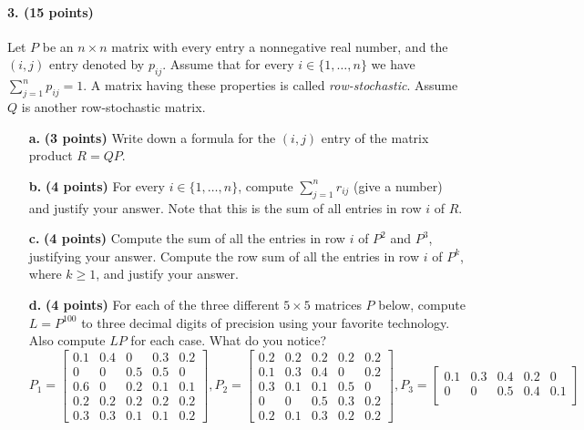 \documentclass[11pt]{article}
\begin{document}
\paragraph{3. (15 points)} Let $P$ be an $n \times n$ matrix with every entry a nonnegative real number, and the $(i,j)$ entry denoted by $p_{ij}$. Assume that for every $i \in \{1,\ldots,n\}$ we have $\sum_{j=1}^n p_{ij}=1$. A matrix having these properties is called \emph{row-stochastic}. Assume $Q$ is another row-stochastic matrix.
\begin{itemize}
  \item[\textbf{a.}] \textbf{(3 points)} Write down a formula for the $(i,j)$ entry of the matrix product $R=QP$.
  \item[\textbf{b.}] \textbf{(4 points)} For every $i \in \{1,\ldots,n\}$, compute  $\sum_{j=1}^n r_{ij}$ (give a number) and justify your answer. Note that this is the sum of all entries in row $i$ of $R$.
  \item[\textbf{c.}] \textbf{(4 points)} Compute the sum of all the entries in row $i$ of $P^2$ and $P^3$, justifying your answer. Compute the row sum of all the entries in row $i$ of $P^k$, where $k \geq 1$, and justify your answer.
  \item[\textbf{d.}] \textbf{(4 points)} For each of the three different $5 \times 5$ matrices $P$ below, compute $L=P^{100}$ to three decimal digits of precision using your favorite technology. Also compute $LP$ for each case. What do you notice?
    $$
    P_1 = \begin{bmatrix}
      0.1 & 0.4 & 0 & 0.3 & 0.2 \\
      0 & 0 & 0.5 & 0.5 & 0 \\
      0.6 & 0 & 0.2 & 0.1 & 0.1 \\
      0.2 & 0.2 & 0.2 & 0.2 & 0.2 \\
      0.3 & 0.3 & 0.1 & 0.1 & 0.2
    \end{bmatrix},
    P_2 = \begin{bmatrix}
      0.2 & 0.2 & 0.2 & 0.2 & 0.2 \\
      0.1 & 0.3 & 0.4 & 0 & 0.2 \\
      0.3 & 0.1 & 0.1 & 0.5 & 0 \\
      0 & 0 & 0.5 & 0.3 & 0.2 \\
      0.2 & 0.1 & 0.3 & 0.2 & 0.2
    \end{bmatrix},
    P_3 = \begin{bmatrix}
      0.1 & 0.3 & 0.4 & 0.2 & 0 \\
      0 & 0 & 0.5 & 0.4 & 0.1 \\

\end{bmatrix}$$
\end{itemize}
\end{document}
